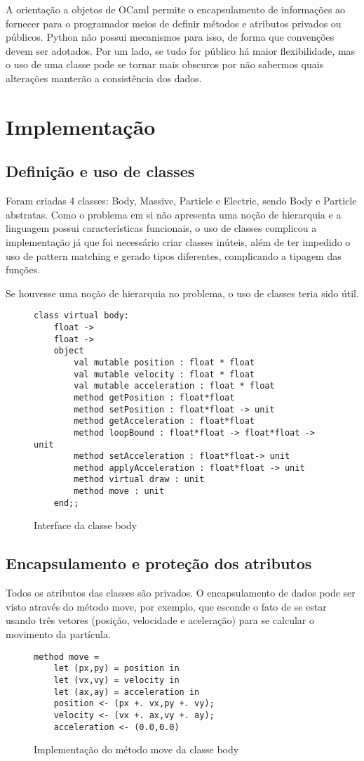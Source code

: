 \documentclass[a4paper,10pt]{article}
\begin{document}
	A orientação a objetos de OCaml permite o encapsulamento de informações ao fornecer para o programador meios de definir métodos e atributos privados ou públicos. Python não possui mecanismos para isso, de forma que convenções devem ser adotados. Por um lado, se tudo for público há maior flexibilidade, mas o uso de uma classe pode se tornar mais obscuros por não sabermos quais alterações manterão a consistência dos dados.
	
\section{Implementação}

\subsection{Definição e uso de classes}
	Foram criadas 4 classes: Body, Massive, Particle e Electric, sendo Body e Particle abstratas. Como o problema em si não apresenta uma noção de hierarquia e a linguagem possui características funcionais, o uso de classes complicou a implementação já que foi necessário criar classes inúteis, além de ter impedido o uso de pattern matching e gerado tipos diferentes, complicando a tipagem das funções.
	
	Se houvesse uma noção de hierarquia no problema, o uso de classes teria sido útil.
	
	\begin{figure}[H]
	\centering	
\begin{lstlisting}
class virtual body:
	float ->
	float ->
	object
		val mutable position : float * float
		val mutable velocity : float * float
		val mutable acceleration : float * float
		method getPosition : float*float
		method setPosition : float*float -> unit
		method getAcceleration : float*float
		method loopBound : float*float -> float*float -> unit
		method setAcceleration : float*float-> unit
		method applyAcceleration : float*float -> unit
		method virtual draw : unit
		method move : unit
	end;;
	\end{lstlisting}	
	\caption{Interface da classe body \label{Body}}
\end{figure}
	
\subsection{Encapsulamento e proteção dos atributos}
	Todos os atributos das classes são privados. O encapsulamento de dados pode ser visto através do método move, por exemplo, que esconde o fato de se estar usando três vetores (posição, velocidade e aceleração) para se calcular o movimento da partícula.
\begin{figure}[H]
	\centering	
	\begin{lstlisting}
method move =
	let (px,py) = position in
	let (vx,vy) = velocity in
	let (ax,ay) = acceleration in
	position <- (px +. vx,py +. vy);
	velocity <- (vx +. ax,vy +. ay);
	acceleration <- (0.0,0.0)
	\end{lstlisting}
	\caption{Implementação do método move da classe body}
\end{figure}
	
\end{document}
